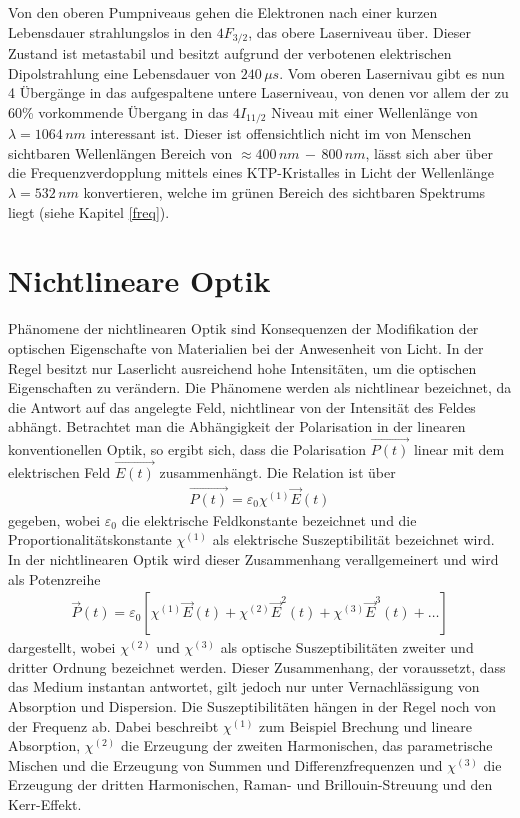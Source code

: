\documentclass[twoside,colorback,accentcolor=tud4c,11pt]{tudreport}
\begin{document}
Von den oberen Pumpniveaus gehen die Elektronen nach einer kurzen Lebensdauer strahlungslos in den $4F_{3/2}$, das obere Laserniveau über. Dieser Zustand ist metastabil und besitzt aufgrund der verbotenen elektrischen Dipolstrahlung eine Lebensdauer von $240\,\si{\mu s}$. Vom oberen Lasernivau gibt es nun 4 Übergänge in das aufgespaltene untere Laserniveau, von denen vor allem der zu 60\% vorkommende Übergang in das $4I_{11/2}$ Niveau mit einer Wellenlänge von $\lambda=1064\,\si{nm}$ interessant ist. Dieser ist offensichtlich nicht im von Menschen sichtbaren Wellenlängen Bereich von $\approx 400\,\si{nm}\,-\, 800\,\si{nm}$, lässt sich aber über die Frequenzverdopplung mittels eines KTP-Kristalles in Licht der Wellenlänge $\lambda=532\,\si{nm}$ konvertieren, welche im grünen Bereich des sichtbaren Spektrums liegt (siehe Kapitel \ref{freq}). \cite{2,4,5}
\section{Nichtlineare Optik}
Phänomene der nichtlinearen Optik sind Konsequenzen der Modifikation der optischen Eigenschafte von Materialien bei der Anwesenheit von Licht. In der Regel besitzt nur Laserlicht ausreichend hohe Intensitäten, um die optischen Eigenschaften zu verändern. Die Phänomene werden als nichtlinear bezeichnet, da die Antwort auf das angelegte Feld, nichtlinear von der Intensität des Feldes abhängt. Betrachtet man die Abhängigkeit der Polarisation in der linearen konventionellen Optik, so ergibt sich, dass die Polarisation $\vec{P(t)}$ linear mit dem elektrischen Feld $\vec{E(t)}$ zusammenhängt. Die Relation ist über 
\begin{align*}
\vec{P(t)}=\varepsilon_0\chi^{(1)}\vec{E}(t)
\end{align*}
gegeben, wobei $\varepsilon_0$ die elektrische Feldkonstante bezeichnet und die Proportionalitätskonstante $\chi^{(1)}$ als elektrische Suszeptibilität bezeichnet wird. In der nichtlinearen Optik wird dieser Zusammenhang verallgemeinert und wird als Potenzreihe
\begin{align*}
\vec{P}(t)=\varepsilon_0 \left[ \chi^{(1)} \vec{E}(t) + \chi^{(2)} \vec{E}^2(t) +  \chi^{(3)}\vec{E}^3(t) + \dots \right]
\end{align*} 
dargestellt, wobei $\chi^{(2)}$ und $\chi^{(3)}$ als optische Suszeptibilitäten zweiter und dritter Ordnung bezeichnet werden. Dieser Zusammenhang, der voraussetzt, dass das Medium instantan antwortet, gilt jedoch nur unter Vernachlässigung von Absorption und Dispersion. Die Suszeptibilitäten hängen in der Regel noch von der Frequenz ab. Dabei beschreibt $\chi^{(1)}$ zum Beispiel Brechung und lineare Absorption, $\chi^{(2)}$ die Erzeugung der zweiten Harmonischen, das parametrische Mischen und die Erzeugung von Summen und Differenzfrequenzen und $\chi^{(3)}$ die Erzeugung der dritten Harmonischen, Raman- und Brillouin-Streuung und den Kerr-Effekt. \cite{2,6}
\end{document}
